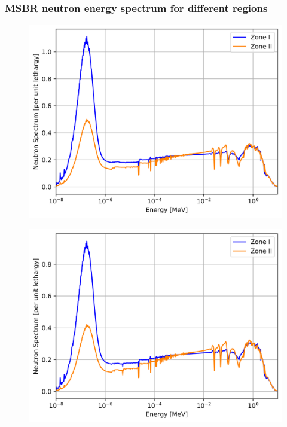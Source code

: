 \documentclass[9pt]{beamer}
\begin{document}
\begin{frame}
  \frametitle{\gls{MSBR} neutron energy spectrum for different regions}
               \begin{figure}[t]
                \vspace*{-0.1in}
                \includegraphics[height=0.35\textwidth]{./images/spectrum_zones_init.png}
               \end{figure}
               \begin{figure}[t]
                \vspace*{-0.1in}
                \includegraphics[height=0.35\textwidth]{./images/spectrum_zones_eq.png}
               \end{figure}
              
\end{frame}
\end{document}
